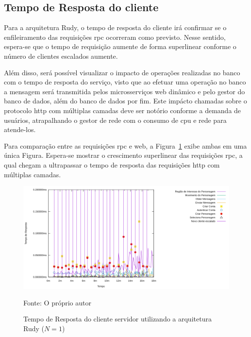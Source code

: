 \subsection{Tempo de Resposta do cliente}

Para a arquitetura Rudy, o tempo de resposta do cliente irá confirmar se o enfileiramento das requisições \ac{rpc} ocorreram como previsto.
%
Nesse sentido, espera-se que o tempo de requisição aumente de forma superlinear conforme o número de clientes escalados aumente.


Além disso, será possível visualizar o impacto de operações realizadas no banco com o tempo de resposta do serviço, visto que ao efetuar uma operação no banco a mensagem será transmitida pelos microsserviços web dinâmico e pelo gestor do banco de dados, além do banco de dados por fim.
%
Este impácto chamadas sobre o protocolo \ac{http} com múltiplas camadas deve ser notório conforme a demanda de usuários, atrapalhando o gestor de rede com o consumo de \ac{cpu} e rede para atende-los.

Para comparação entre as requisições \ac{rpc} e web, a Figura~\ref{fig:rudy_t4_reqs} exibe ambas em uma única Figura.
%
Espera-se mostrar o crescimento superlinear das requisições \ac{rpc}, a qual chegam a ultrapassar o tempo de resposta das requisições \ac{http} com múltiplas camadas.

\begin{figure}[htb!]
    \caption{Tempo de Resposta do cliente servidor utilizando a arquitetura Rudy ($N=1$)}
    \label{fig:rudy_t4_reqs}
    \includegraphics[width=\textwidth]{metricas_rudy_t4/rudyc.png}
    \centering
    
    Fonte: O próprio autor
\end{figure}

